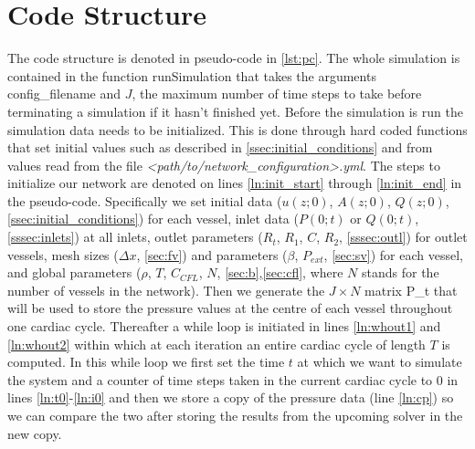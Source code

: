 \documentclass[a4paper, oneside]{discothesis}
\begin{document}
							\section{Code Structure} \label{sec:cs}
							The code structure is denoted in pseudo-code in \autoref{lst:pc}.
							The whole simulation is contained in the function runSimulation that takes the arguments config\_filename and $J$, the maximum number of time steps to take before terminating a simulation if it hasn't finished yet.
							Before the simulation is run the simulation data needs to be initialized.
							This is done through hard coded functions that set initial values such as described in \autoref{ssec:initial_conditions} and from values read from the file \emph{<path/to/network\_configuration>.yml}.
							The steps to initialize our network are denoted on lines \ref{ln:init_start} through \ref{ln:init_end} in the pseudo-code.
							Specifically we set initial data ($u(z;0)$, $A(z;0)$, $Q(z;0)$, \autoref{ssec:initial_conditions}) for each vessel, inlet data ($P(0;t)$ or $Q(0;t)$, \autoref{sssec:inlets}) at all inlets, outlet parameters ($R_t$, $R_1$, $C$, $R_2$, \autoref{sssec:outl}) for outlet vessels, mesh sizes ($\Delta x$, \autoref{sec:fv}) and parameters ($\beta$, $P_{ext}$, \autoref{sec:sv}) for each vessel, and global parameters ($\rho$, $T$, $C_{CFL}$, $N$, \autoref{sec:b},\autoref{sec:cfl}, where $N$ stands for the number of vessels in the network).
							Then we generate the $J \times N$ matrix P\_t that will be used to store the pressure values at the centre of each vessel throughout one cardiac cycle.
							Thereafter a while loop is initiated in lines \ref{ln:whout1} and \ref{ln:whout2} within which at each iteration an entire cardiac cycle of length $T$ is computed.
							In this while loop we first set the time $t$ at which we want to simulate the system and a counter of time steps taken in the current cardiac cycle to $0$ in lines \ref{ln:t0}-\ref{ln:i0} and then we store a copy of the pressure data (line \ref{ln:cp}) so we can compare the two after storing the results from the upcoming solver in the new copy.
\end{document}
